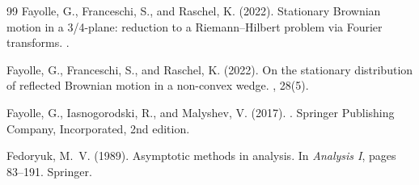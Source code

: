 \documentclass[11pt]{article}
\theoremstyle{definition}
\begin{document}
\begin{thebibliography}{99}
Fayolle, G., Franceschi, S., and Raschel, K. (2022).
\newblock Stationary Brownian motion in a 3/4-plane: reduction to a Riemann--Hilbert problem via Fourier transforms.
.

Fayolle, G., Franceschi, S., and Raschel, K. (2022).
\newblock On the stationary distribution of reflected Brownian motion in a non-convex wedge.
, 28(5).



Fayolle, G., Iasnogorodski, R., and Malyshev, V. (2017).
.
\newblock Springer Publishing Company, Incorporated, 2nd edition.

Fedoryuk, M.~V. (1989).
\newblock Asymptotic methods in analysis.
\newblock In {\em Analysis {I}}, pages 83--191. Springer.





\end{thebibliography}
\end{document}
